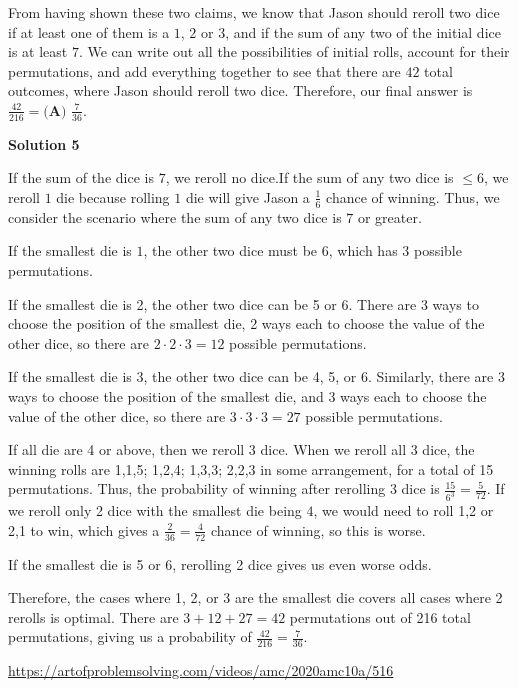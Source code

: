 \begin{enumerate}
 From having shown these two claims, we know that Jason should reroll two dice if at least one of them is a $1$, $2$ or $3$, and if the sum of any two of the initial dice is at least $7$. We can write out all the possibilities of initial rolls, account for their permutations, and add everything together to see that there are $42$ total outcomes, where Jason should reroll two dice. Therefore, our final answer is $\frac{42}{216} = \boxed{\textbf{(A) } \frac{7}{36}}$.

 



\textbf{Solution 5}

If the sum of the dice is $7$, we reroll no dice.If the sum of any two dice is $\leq 6$, we reroll $1$ die because rolling $1$ die will give Jason a $\frac{1}{6}$ chance of winning. Thus, we consider the scenario where the sum of any two dice is $7$ or greater. 

 
If the smallest die is $1$, the other two dice must be $6$, which has $3$ possible permutations.

 If the smallest die is 2, the other two dice can be 5 or 6. There are 3 ways to choose the position of the smallest die, 2 ways each to choose the value of the other dice, so there are $2 \cdot 2 \cdot 3 = 12$ possible permutations.

 If the smallest die is 3, the other two dice can be 4, 5, or 6. Similarly, there are 3 ways to choose the position of the smallest die, and 3 ways each to choose the value of the other dice, so there are $3 \cdot 3 \cdot 3 = 27$ possible permutations.

 If all die are 4 or above, then we reroll 3 dice. When we reroll all 3 dice, the winning rolls are 1,1,5; 1,2,4; 1,3,3; 2,2,3 in some arrangement, for a total of 15 permutations. Thus, the probability of winning after rerolling 3 dice is $\frac{15}{6^3} = \frac{5}{72}$. If we reroll only 2 dice with the smallest die being $4$, we would need to roll 1,2 or 2,1 to win, which gives a $\frac{2}{36} = \frac{4}{72}$ chance of winning, so this is worse.

 If the smallest die is 5 or 6, rerolling 2 dice gives us even worse odds.

 
Therefore, the cases where 1, 2, or 3 are the smallest die covers all cases where 2 rerolls is optimal. There are $3+12+27 = 42$ permutations out of 216 total permutations, giving us a probability of $\frac{42}{216} = \boxed{\frac{7}{36}}$.

 \href{https://artofproblemsolving.com/videos/amc/2020amc10a/516}{https://artofproblemsolving.com/videos/amc/2020amc10a/516}


\end{enumerate}
